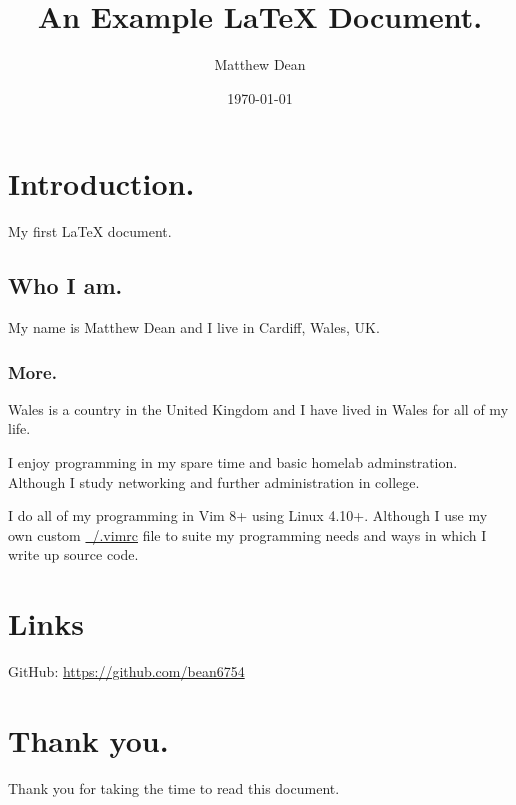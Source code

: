 \documentclass[a4paper, 12pt]{article}
\begin{document}
\title{An Example LaTeX Document.}
\author{Matthew Dean}
\date{\today}
\maketitle

\section{Introduction.}

My first LaTeX document.

\subsection{Who I am.}

My name is Matthew Dean and I live in Cardiff, Wales, UK.

\subsubsection{More.}

Wales is a country in the United Kingdom and I have lived in Wales for all of my life.

I enjoy programming in my spare time and basic homelab adminstration. Although I study networking and further administration in college.

I do all of my programming in Vim 8+ using Linux 4.10+. Although I use my own custom \href{https://raw.githubusercontent.com/Bean6754/home/master/.vimrc}{~/.vimrc} file to suite my programming needs and ways in which I write up source code.

\section{Links}

GitHub: \url{https://github.com/bean6754}


\iffalse
This is a
multiline
comment.
\fi

\section{Thank you.}

Thank you for taking the time to read this document.
\end{document}
